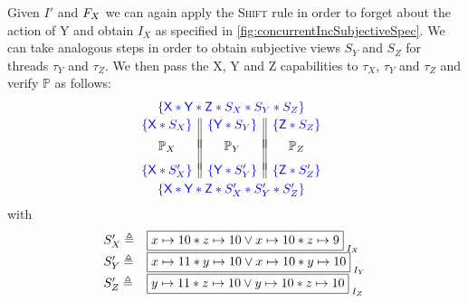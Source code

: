 Given $I'$ and $F_{X}$ we can again apply the \textsc{Shift} rule in order to forget about the action of \textsf{Y} and obtain $I_X$ as specified in \fig\ref{fig:concurrentIncSubjectiveSpec}. We can take analogous steps in order to obtain subjective views $S_Y$ and $S_Z$ for threads $\tau_Y$ and $\tau_Z$. We then pass the \textsf{X}, \textsf{Y} and \textsf{Z} capabilities to $\tau_X$, $\tau_Y$ and $\tau_Z$ and verify $\mathbb{P}$ as follows:
%
\[
\hspace*{-0.2cm}
\begin{array}{c}
	\color{blue}{\left\{\textsf{X} * \textsf{Y} *  \textsf{Z} *  S_X * S_Y * S_Z \right\}}\vspace*{2pt}\\
	
	\begin{array}{c || c || c}
		\color{blue}{\left\{\textsf{X} * S_X \right\}} & \color{blue}{\left\{\textsf{Y} * S_Y \right\}} & \color{blue}{\left\{\textsf{Z} * S_Z \right\}}\\
		&&\vspace*{-7pt}\\
		\mathbb{P}_X & \mathbb{P}_Y & \mathbb{P}_Z\\
		&&\vspace*{-5pt}\\

		\color{blue}{
			\left\{
					\textsf{X} * S'_X
			\right\}
		} 
		& 
		\color{blue}{
			\left\{
				\textsf{Y} * S'_Y
			\right\}
		} 

		&
		
		\color{blue}{
			\left\{
				\textsf{Z} * S'_Z
			\right\}
		} 		
		\vspace*{3pt}
	\end{array}\\
	\color{blue}{\left\{\textsf{X} * \textsf{Y} *  \textsf{Z} *  S'_X * S'_Y * S'_Z \right\}}\\
\end{array}
\]
%
with
%
\[
\begin{array}{l l}
	S'_X \eqdef & \shared{\cell{x}{10} * \cell{z}{10} \lor \cell{x}{10} * \cell{z}{9} }{I_X}\\
	S'_Y \eqdef & \shared{\cell{x}{11} * \cell{y}{10} \lor \cell{x}{10} * \cell{y}{10} }{I_Y}\\
	S'_Z \eqdef & \shared{\cell{y}{11} * \cell{z}{10} \lor \cell{y}{10} * \cell{z}{10} }{I_Z}
\end{array}
\]
%
%
